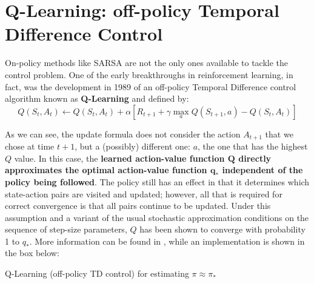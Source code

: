 \section{Q-Learning: off-policy Temporal Difference Control}
On-policy methods like SARSA are not the only ones available to tackle the control problem. One of the early breakthroughs in reinforcement learning, in fact, was the development in 1989 of an off-policy Temporal Difference control algorithm known as \textbf{Q-Learning} and defined by:
\begin{equation}
    Q(S_t,A_t) \leftarrow Q(S_t,A_t) + \alpha \left[ R_{t+1} + \gamma \max_a Q(S_{t+1},a) - Q(S_t,A_t) \right]
    \label{eq:ch5-qlearningupdaterule}
\end{equation}

As we can see, the update formula does not consider the action $A_{t+1}$ that we chose at time $t+1$, but a (possibly) different one: $a$, the one that has the highest $Q$ value. In this case, the \textbf{learned action-value function $\boldsymbol{Q}$ directly approximates the optimal action-value function $\boldsymbol{q_*}$ independent of the policy being followed}. The policy still has an effect in that it determines which state-action pairs are visited and updated; however, all that is required for correct convergence is that all pairs continue to be updated. Under this assumption and a variant of the usual stochastic approximation conditions on the sequence of step-size parameters, $Q$ has been shown to converge with probability 1 to $q_*$. More information can be found in \cite{Watkins1992}, while an implementation is shown in the box below:

\begin{algorithm}[H]
\SetAlgoLined
\Parameters{step size $\alpha \in \left] 0,1 \right]$, small $\varepsilon > 0$}

\caption{Q-Learning (off-policy TD control) for estimating $\pi \approx \pi_*$}
\end{algorithm}

